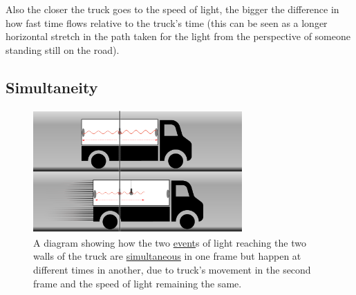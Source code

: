 Also the closer the truck goes to the speed of light, the bigger the difference in how fast time flows relative to the truck's time (this can be seen as a longer horizontal stretch in the path taken for the light from the perspective of someone standing still on the road).


\subsection{Simultaneity}


\begin{figure}[htbp]
	\centering
	\includegraphics[width=8cm]{images/pdf/lorry_simul.pdf}
	\caption{A diagram showing how the two \protect\hyperlink{def-event}{event}s of light reaching the two walls of the truck are \protect\hyperlink{def-simultaneity}{simultaneous} in one frame but happen at different times in another, due to truck's movement in the second frame and the speed of light remaining the same.}
	\label{fig: truck simultaneity}
\end{figure}

